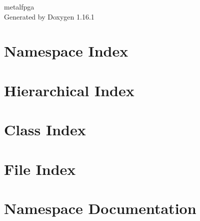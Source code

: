 \documentclass[twoside]{book}
\newcommand{\+}{\discretionary{\mbox{\scriptsize$\hookleftarrow$}}{}{}}
\newcommand{\clearemptydoublepage}{%
    \newpage{\pagestyle{empty}\cleardoublepage}%
  }
\begin{document}
  \raggedbottom
    \hypersetup{pageanchor=false,
                bookmarksnumbered=true,
                pdfencoding=unicode
               }
  \begin{titlepage}
  \vspace*{7cm}
  \begin{center}%
  {\Large metalfpga}\\
  \vspace*{1cm}
  {\large Generated by Doxygen 1.16.1}\\
  \end{center}
  \end{titlepage}
  \clearemptydoublepage
  \tableofcontents
  \clearemptydoublepage
  \hypersetup{pageanchor=true}
\chapter{Namespace Index}

\chapter{Hierarchical Index}

\chapter{Class Index}

\chapter{File Index}

\chapter{Namespace Documentation}





















\end{document}
